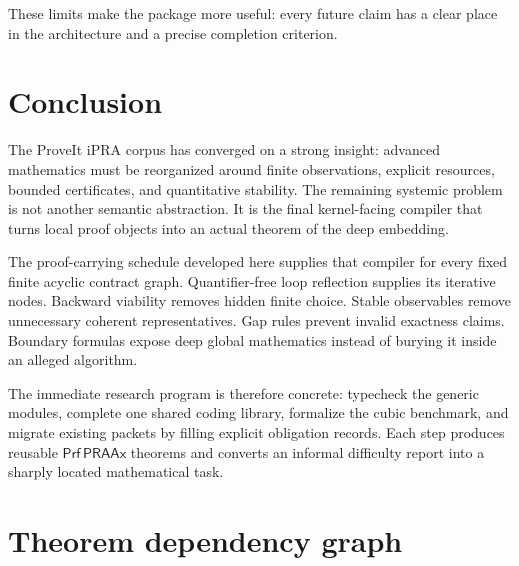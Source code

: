 \documentclass[11pt]{article}
\newcommand{\PRAAx}{\mathsf{PRAAx}}
\newcommand{\Prf}{\mathsf{Prf}}
\begin{document}
These limits make the package more useful: every future claim has a clear place
in the architecture and a precise completion criterion.

\section{Conclusion}

The ProveIt iPRA corpus has converged on a strong insight: advanced mathematics
must be reorganized around finite observations, explicit resources, bounded
certificates, and quantitative stability.  The remaining systemic problem is
not another semantic abstraction.  It is the final kernel-facing compiler that
turns local proof objects into an actual theorem of the deep embedding.

The proof-carrying schedule developed here supplies that compiler for every
fixed finite acyclic contract graph.  Quantifier-free loop reflection supplies
its iterative nodes.  Backward viability removes hidden finite choice.  Stable
observables remove unnecessary coherent representatives.  Gap rules prevent
invalid exactness claims.  Boundary formulas expose deep global mathematics
instead of burying it inside an alleged algorithm.

The immediate research program is therefore concrete: typecheck the generic
modules, complete one shared coding library, formalize the cubic benchmark, and
migrate existing packets by filling explicit obligation records.  Each step
produces reusable \(\Prf\,\PRAAx\) theorems and converts an informal difficulty
report into a sharply located mathematical task.

\appendix

\section{Theorem dependency graph}
\end{document}
